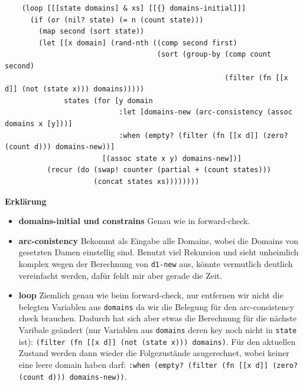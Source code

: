 \documentclass[a4paper,10pt]{article}
\begin{document}
\begin{lstlisting}
    (loop [[[state domains] & xs] [[{} domains-initial]]]
      (if (or (nil? state) (= n (count state)))
        (map second (sort state))
        (let [[x domain] (rand-nth ((comp second first)
                                    (sort (group-by (comp count second)
                                                    (filter (fn [[x d]] (not (state x))) domains)))))
              states (for [y domain
                           :let [domains-new (arc-consistency (assoc domains x [y]))]
                           :when (empty? (filter (fn [[x d]] (zero? (count d))) domains-new))]
                       [(assoc state x y) domains-new])]
          (recur (do (swap! counter (partial + (count states)))
                     (concat states xs))))))))
\end{lstlisting}
\textbf{Erklärung}
\begin{itemize}
  \item \textbf{domains-initial und constrains} Genau wie in forward-check.
    \item \textbf{arc-conistency} Bekommt als Eingabe alle Domains, wobei die Domains von gesetzten Damen einstellig sind. Benutzt viel Rekursion und sieht unheimlich komplex wegen der Berechnung von \texttt{d1-new} aus, könnte vermutlich deutlich vereinfacht werden, dafür fehlt mir aber gerade die Zeit.
    \item \textbf{loop} Ziemlich genau wie beim forward-check, nur entfernen wir nicht die belegten Variablen aus \texttt{domains} da wir die Belegung für den arc-consistency check brauchen. Dadurch hat sich aber etwas die Berechnung für die nächste Varibale geändert (nur Variablen aus \texttt{domains} deren key noch nicht in \texttt{state} ist): \texttt{(filter (fn [[x d]] (not (state x))) domains)}. Für den aktuellen Zustand werden dann wieder die Folgezustände asugerechnet, wobei keiner eine leere domain haben darf: \texttt{:when (empty? (filter (fn [[x d]] (zero? (count d))) domains-new))}. 
\end{itemize}
\end{document}
